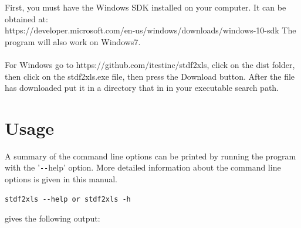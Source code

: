 \documentclass[letterpaper]{article}
\begin{document}
First, you must have the Windows SDK installed on your computer.  It can be obtained at:\\
https://developer.microsoft.com/en-us/windows/downloads/windows-10-sdk The program will also work on Windows7.\\
\\
\noindent
For Windows go to https://github.com/itestinc/stdf2xls, click on the dist folder, then 
click on the stdf2xls.exe file, then press the Download button.  After the file has downloaded
put it in a directory that in in your executable search path.

\section{\bf Usage}

A summary of the command line options can be printed by running the program
with the '\texttt{-{}-}help' option.  More detailed information about the command line
options is given in this manual.
\begin{verbatim}
stdf2xls --help or stdf2xls -h
\end{verbatim}
gives the following output:
\begingroup
\scriptsize
\end{document}
